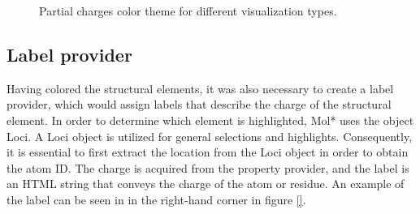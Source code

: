 \documentclass[
  digital,     %
  oneside,     %
  nosansbold,  %
  nocolorbold, %
  lof,         %
  lot,         %
]{fithesis4}
\begin{document}
\begin{figure}[htbp]
  \centering
  \caption{Partial charges color theme for different visualization types.}
  \label{fig:partial_charges_color_theme}
\end{figure}

\subsection{Label provider}
\label{subsection:label_provider}


Having colored the structural elements, it was also necessary to create a label provider, which would assign labels that describe the charge of the structural element. In order to determine which element is highlighted, Mol* uses the object Loci. A Loci object is utilized for general selections and highlights. Consequently, it is essential to first extract the location from the Loci object in order to obtain the atom ID. The charge is acquired from the property provider, and the label is an HTML string that conveys the charge of the atom or residue. An example of the label can be seen in in the right-hand corner in figure \ref{}.
\end{document}
